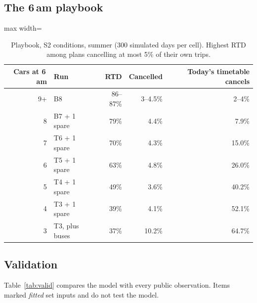 \documentclass[11pt]{article}
\begin{document}
\subsection{The 6\,am playbook}\label{sec:resplay}
\begin{table}[ht]\centering\small
\begin{adjustbox}{max width=\linewidth}
\begin{tabular}{@{}rlrrr@{}}
\toprule
Cars at 6\,am & Run & RTD & Cancelled & Today's timetable cancels \\ \midrule
9+ & B8 & 86--87\% & 3--4.5\% & 2--4\% \\
8 & B7 + 1 spare & 79\% & 4.4\% & 7.9\% \\
7 & T6 + 1 spare & 70\% & 4.3\% & 15.0\% \\
6 & T5 + 1 spare & 63\% & 4.8\% & 26.0\% \\
5 & T4 + 1 spare & 49\% & 3.6\% & 40.2\% \\
4 & T3 + 1 spare & 39\% & 4.1\% & 52.1\% \\
3 & T3, plus buses & 37\% & 10.2\% & 64.7\% \\
\bottomrule
\end{tabular}
\end{adjustbox}
\caption{Playbook, S2 conditions, summer (300 simulated days per cell). Highest RTD among plans cancelling at most 5\% of their own trips.}\label{tab:playbook}
\end{table}

\subsection{Validation}\label{sec:valid}
Table~\ref{tab:valid} compares the model with every public observation. Items marked \emph{fitted} set inputs and do not test the model.
\end{document}
